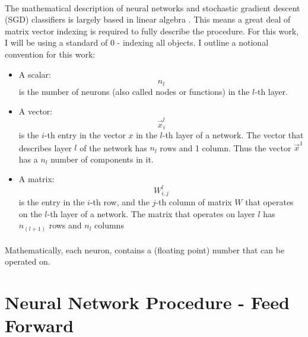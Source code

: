 \documentclass[12pt,letterpaper]{article}
\begin{document}
\paragraph*{}The mathematical description of neural networks and stochastic gradient descent (SGD) classifiers is largely based in linear algebra \cite{Goodfellow}. This means a great deal of matrix vector indexing is required to fully describe the procedure. For this work, I will be using a standard of $0$ - indexing all objects. I outline a notional convention for this work:
\begin{itemize}
\item A scalar:
\begin{equation}
n_l
\end{equation} 
is the number of neurons (also called nodes or functions) in the 
$l$-th layer. 
\item A vector:
\begin{equation}
\vec{x}_{i}^{l}
\end{equation}
is the $i$-th entry in the vector $x$ in the $l$-th layer of a network. The vector that describes layer $l$ of the network has $n_l$ rows and 1 column. Thus the vector $\vec{x}^1$ has a $n_l$ number of components in it.
\item A matrix:
\begin{equation}
W_{i,j}^{l}
\end{equation}
is the entry in the $i$-th row, and the $j$-th column of matrix $W$ that operates on the $l$-th layer of a network. The matrix that operates on layer $l$ has $n_{(l+1)}$ rows and $n_{l}$ columns
\end{itemize}
\paragraph*{}Mathematically, each neuron, contains a (floating point) number that can be operated on. 


\section{Neural Network Procedure  - Feed Forward}
\end{document}
